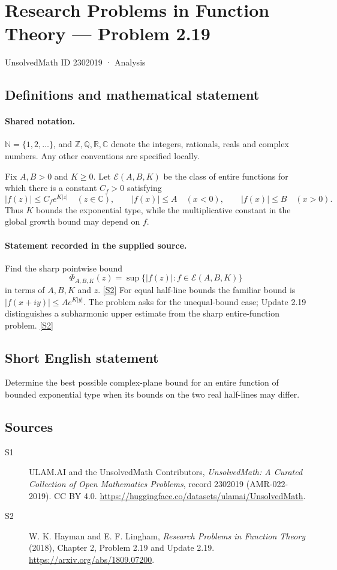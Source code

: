 \documentclass[11pt]{article}
\newcommand{\sref}[2]{\hyperlink{source:#1:#2}{[S#2]}}
\begin{document}
\setcounter{section}{2302018}
\section{Research Problems in Function Theory — Problem 2.19}\label{2302019}
{\small\sffamily UnsolvedMath ID 2302019 · Analysis}
\subsection{Definitions and mathematical statement}

\paragraph{Shared notation.}$\mathbb N=\{1,2,\ldots\}$, and $\mathbb Z,\mathbb Q,\mathbb R,\mathbb C$ denote the integers, rationals, reals and complex numbers. Any other conventions are specified locally.


Fix $A,B>0$ and $K\ge0$. Let $\mathcal E(A,B,K)$ be the class of entire functions for which there is a constant $C_f>0$ satisfying
\[
 |f(z)|\le C_f e^{K|z|}\quad(z\in\mathbb C),\qquad
 |f(x)|\le A\quad(x<0),\qquad |f(x)|\le B\quad(x>0).
\]
Thus $K$ bounds the exponential type, while the multiplicative constant in the global growth bound may depend on $f$.

\paragraph{Statement recorded in the supplied source.}
Find the sharp pointwise bound
\[\Phi_{A,B,K}(z)=\sup\{|f(z)|:f\in\mathcal E(A,B,K)\}\]
in terms of $A,B,K$ and $z$. \sref{2302019}{2}
For equal half-line bounds the familiar bound is $|f(x+iy)|\le A e^{K|y|}$. The problem asks for the unequal-bound case; Update 2.19 distinguishes a subharmonic upper estimate from the sharp entire-function problem. \sref{2302019}{2}
\subsection{Short English statement}
Determine the best possible complex-plane bound for an entire function of bounded exponential type when its bounds on the two real half-lines may differ.
\subsection{Sources}
\begin{description}
\item[\hypertarget{source:2302019:1}{S1}] ULAM.AI and the UnsolvedMath Contributors, \emph{UnsolvedMath: A Curated Collection of Open Mathematics Problems}, record 2302019 (AMR-022-2019). CC BY 4.0. \url{https://huggingface.co/datasets/ulamai/UnsolvedMath}.
\item[\hypertarget{source:2302019:2}{S2}] W. K. Hayman and E. F. Lingham, \emph{Research Problems in Function Theory} (2018), Chapter 2, Problem 2.19 and Update 2.19. \url{https://arxiv.org/abs/1809.07200}.
\end{description}
\label{end:2302019}
\end{document}

